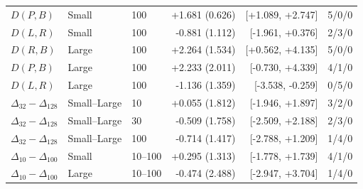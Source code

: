 \begin{longtable}{lllrrr}
$D(P,B)$ & Small & 100 & +1.681 (0.626) & [+1.089, +2.747] & 5/0/0\\
$D(L,R)$ & Small & 100 & -0.881 (1.112) & [-1.961, +0.376] & 2/3/0\\
\midrule
$D(R,B)$ & Large & 100 & +2.264 (1.534) & [+0.562, +4.135] & 5/0/0\\
$D(P,B)$ & Large & 100 & +2.233 (2.011) & [-0.730, +4.339] & 4/1/0\\
$D(L,R)$ & Large & 100 & -1.136 (1.359) & [-3.538, -0.259] & 0/5/0\\
\midrule
$\Delta_{32}-\Delta_{128}$ & Small--Large & 10 & +0.055 (1.812) & [-1.946, +1.897] & 3/2/0\\
$\Delta_{32}-\Delta_{128}$ & Small--Large & 30 & -0.509 (1.758) & [-2.509, +2.188] & 2/3/0\\
$\Delta_{32}-\Delta_{128}$ & Small--Large & 100 & -0.714 (1.417) & [-2.788, +1.209] & 1/4/0\\
\midrule
$\Delta_{10}-\Delta_{100}$ & Small & 10--100 & +0.295 (1.313) & [-1.778, +1.739] & 4/1/0\\
$\Delta_{10}-\Delta_{100}$ & Large & 10--100 & -0.474 (2.488) & [-2.947, +3.704] & 1/4/0\\
\bottomrule
\end{longtable}
\endgroup
